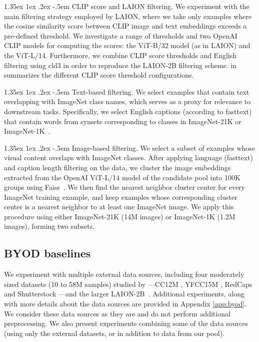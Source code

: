\documentclass[dvipsnames,11pt]{article}
\makeatletter
\renewcommand\paragraph{\@startsection{paragraph}{4}{\z@}                                     {1.35ex \@plus1ex \@minus.2ex}                                {-.5em}
{\normalfont\normalsize\bfseries}}
\newcommand{\byod}{\textsc{BYOD}\xspace}
\makeatother
\begin{document}
\paragraph{CLIP score and LAION filtering.} We experiment with the main filtering strategy employed by LAION, where we take only examples where the cosine similarity score between CLIP image and text embeddings exceeds a pre-defined threshold. We investigate a range of thresholds and two OpenAI CLIP models for computing the scores: the ViT-B/32 model (as in LAION) and the ViT-L/14. Furthermore, we combine CLIP score thresholds and English filtering using cld3 in order to reproduce the LAION-2B filtering scheme.  in  summarizes the different CLIP score threshold configurations. 

\paragraph{Text-based filtering.} We select examples that contain text overlapping with ImageNet class names, which serves as a proxy for relevance to downstream tasks. Specifically, we select English captions (according to fasttext) that contain words from synsets corresponding to classes in ImageNet-21K or ImageNet-1K~\citep{deng2009imagenet}.

\paragraph{Image-based filtering.} We select a subset of examples whose visual content overlaps with ImageNet classes. After applying language (fasttext) and caption length filtering on the data, we cluster the image embeddings extracted from the OpenAI ViT-L/14 model of the candidate pool into 100K groups using Faiss~\citep{johnson2019billion}. We then find the nearest neighbor cluster center for every ImageNet training example, and keep examples whose corresponding cluster center is a nearest neighbor to at least one ImageNet image. We apply this procedure using either ImageNet-21K (14M images) or ImageNet-1K (1.2M images), forming two subsets.

\subsection{\byod baselines} \label{sec:byod-baselines}
We experiment with multiple external data sources, including four moderately sized datasets (10 to 58M samples) studied by \citet{nguyen2022quality}---CC12M \cite{changpinyo2021conceptual}, YFCC15M \cite{yfcc100m,radford2021learning}, RedCaps \cite{desai2021redcaps} and Shutterstock \cite{nguyen2022quality}---and the larger LAION-2B~\cite{laion5b}. Additional experiments, along with more details about the data sources are provided in Appendix \ref{app:byod}. We consider these data sources as they are and do not perform additional preprocessing. We also present experiments  combining some of the data sources (using only the external datasets, or in addition to data from our pool).
\end{document}
